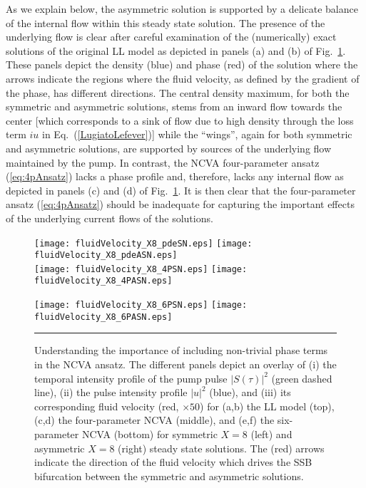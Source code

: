 %
As we explain below, the asymmetric solution is supported
by a delicate balance of the internal flow within this
steady state solution. 
%
The presence of the underlying flow is clear after careful examination
of the (numerically) exact solutions of the original LL model as depicted
in panels (a) and (b) of Fig.~\ref{fig4SSB}. These panels depict the
density (blue) and phase (red) of the solution where the arrows
indicate the regions where the fluid velocity, as defined by the
gradient of the phase, has different directions. 
%
The central density maximum, for both the symmetric and
asymmetric solutions, stems from an inward flow towards the
center [which corresponds to a sink of flow due to high density 
through the loss term $iu$ in Eq.~(\ref{LugiatoLefever})]
while the ``wings'', again for both symmetric and asymmetric solutions, 
are supported by sources of the underlying flow maintained by
the pump.
%
In contrast, the NCVA four-parameter ansatz (\ref{eq:4pAnsatz}) lacks
a phase profile and, therefore, lacks any internal flow as depicted
in panels (c) and (d) of Fig.~\ref{fig4SSB}.
%
It is then clear that the four-parameter ansatz (\ref{eq:4pAnsatz})
should be inadequate for capturing the important effects of
the underlying current flows of the solutions.

\begin{figure}[t!]
\centering
\texttt{[image: fluidVelocity\_X8\_pdeSN.eps]} \quad
\texttt{[image: fluidVelocity\_X8\_pdeASN.eps]}
\\
\texttt{[image: fluidVelocity\_X8\_4PSN.eps]} \quad
\texttt{[image: fluidVelocity\_X8\_4PASN.eps]}
\\
\centerline{\texttt{[image: fluidVelocity\_X8\_6PSN.eps]} \quad
\texttt{[image: fluidVelocity\_X8\_6PASN.eps]}}
  \rule{35em}{0.5pt}
\caption[Fluid Velocity of LL Equation and NCVA Solutions]{Understanding the importance of including non-trivial phase
terms in the NCVA ansatz. The different panels depict an overlay of 
(i) the temporal intensity profile of the pump pulse $|S(\tau)|^2$ 
(green dashed line),
(ii) the pulse intensity profile $|u|^2$ (blue), and 
(iii) its corresponding fluid velocity (red, $\times 50$)
for 
(a,b) the LL model (top), 
(c,d) the four-parameter NCVA (middle), and 
(e,f) the six-parameter NCVA (bottom)
for symmetric $X=8$ (left) and asymmetric $X=8$ (right) steady state solutions.
%
The (red) arrows indicate the direction of the fluid velocity which drives 
the SSB bifurcation between the symmetric and asymmetric solutions.
}
\label{fig4SSB}
\vskip -0.5cm
\end{figure}


